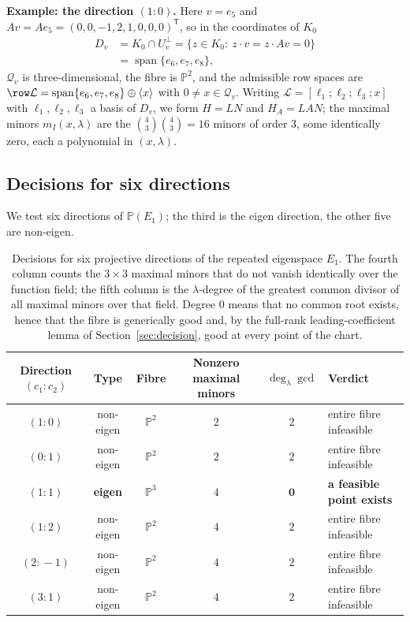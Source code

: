\textbf{Example: the direction $(1\!:\!0)$.} Here $v=e_5$ and
$Av=Ae_5=(0,0,-1,2,1,0,0,0)^{\mathsf{T}}$, so in the coordinates of $K_0$
\begin{equation}\label{sec6:eq:Dv}
\begin{aligned}
D_v&=K_0\cap U_v^{\perp}=\{z\in K_0:\ z\cdot v=z\cdot Av=0\}\\
   &=\operatorname{span}\{e_6,e_7,e_8\},
\end{aligned}
\end{equation}
$\mathcal{Q}_v$ is three-dimensional, the fibre is $\mathbb{P}^{2}$, and the admissible row spaces are
$\row\mathcal{L}=\operatorname{span}\{e_6,e_7,e_8\}\oplus\langle x\rangle$ with
$0\neq x\in\mathcal{Q}_v$. Writing $\mathcal{L}=[\ell_1;\ell_2;\ell_3;x]$ with $\ell_1,\ell_2,\ell_3$ a
basis of $D_v$, we form $H=LN$ and $H_A=LAN$; the maximal minors $m_I(x,\lambda)$ are the
$\binom{4}{3}\binom{4}{3}=16$ minors of order $3$, some identically zero, each a polynomial in
$(x,\lambda)$.

\subsection{Decisions for six directions}\label{sec6:sub:six}

We test six directions of $\mathbb{P}(E_1)$; the third is the eigen direction, the other five are
non-eigen.

\begin{table}[t]
\centering
\caption{Decisions for six projective directions of the repeated eigenspace $E_1$. The fourth column
counts the $3\times3$ maximal minors that do not vanish identically over the function field; the fifth
column is the $\lambda$-degree of the greatest common divisor of all maximal minors over that field.
Degree $0$ means that no common root exists, hence that the fibre is generically good and, by the
full-rank leading-coefficient lemma of Section~\ref{sec:decision}, good at every point of the chart.}
\label{sec6:tab:dirs}
\begin{tabular}{@{}cccccl@{}}
\toprule
Direction $(c_1\!:\!c_2)$ & Type & Fibre & Nonzero maximal minors & $\deg_\lambda\gcd$ & Verdict\\
\midrule
$(1\!:\!0)$ & non-eigen & $\mathbb{P}^{2}$ & $2$ & $2$ & entire fibre infeasible\\
$(0\!:\!1)$ & non-eigen & $\mathbb{P}^{2}$ & $2$ & $2$ & entire fibre infeasible\\
$(1\!:\!1)$ & \textbf{eigen} & $\mathbb{P}^{3}$ & $4$ & $\mathbf{0}$ & \textbf{a feasible point exists}\\
$(1\!:\!2)$ & non-eigen & $\mathbb{P}^{2}$ & $4$ & $2$ & entire fibre infeasible\\
$(2\!:\!-1)$ & non-eigen & $\mathbb{P}^{2}$ & $4$ & $2$ & entire fibre infeasible\\
$(3\!:\!1)$ & non-eigen & $\mathbb{P}^{2}$ & $4$ & $2$ & entire fibre infeasible\\
\bottomrule
\end{tabular}
\end{table}

